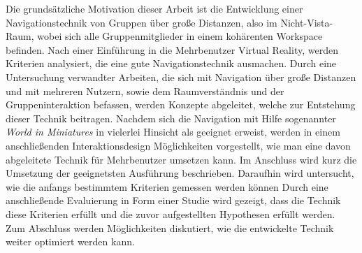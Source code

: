Die grundsätzliche Motivation dieser Arbeit ist die Entwicklung einer Navigationstechnik von Gruppen über große Distanzen, also im Nicht-Vista-Raum, wobei sich alle Gruppenmitglieder in einem kohärenten Workspace befinden. Nach einer Einführung in die Mehrbenutzer Virtual Reality, werden Kriterien analysiert, die eine gute Navigationstechnik ausmachen.
Durch eine Untersuchung verwandter Arbeiten, die sich mit Navigation über große Distanzen und mit mehreren Nutzern, sowie dem Raumverständnis und der Gruppeninteraktion befassen, werden Konzepte abgeleitet, welche zur Entstehung dieser Technik beitragen.
Nachdem sich die Navigation mit Hilfe sogenannter \textit{World in Miniatures} in vielerlei Hinsicht als geeignet erweist, werden in einem anschließenden Interaktionsdesign Möglichkeiten vorgestellt, wie man eine davon abgeleitete Technik für Mehrbenutzer umsetzen kann.
Im Anschluss wird kurz die Umsetzung der geeignetsten Ausführung beschrieben. Daraufhin wird untersucht, wie die anfangs bestimmtem Kriterien gemessen werden können
Durch eine anschließende Evaluierung in Form einer Studie wird gezeigt, dass die Technik diese Kriterien erfüllt und die zuvor aufgestellten Hypothesen erfüllt werden. Zum Abschluss werden Möglichkeiten diskutiert, wie die entwickelte Technik weiter optimiert werden kann.
